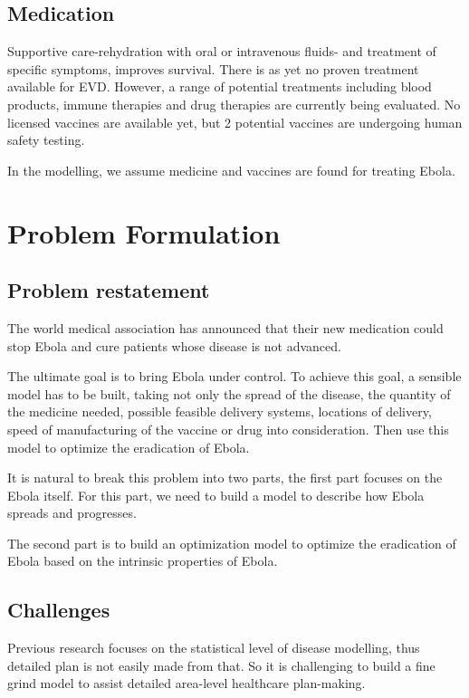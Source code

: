 \documentclass[12pt]{article}
\begin{document}
\subsection{Medication}

Supportive care-rehydration with oral or intravenous fluids- and treatment of specific symptoms, improves survival. There is as yet no proven treatment available for EVD. However, a range of potential treatments including blood products, immune therapies and drug therapies are currently being evaluated. No licensed vaccines are available yet, but 2 potential vaccines are undergoing human safety testing.

In the modelling, we assume medicine and vaccines are found for treating Ebola.


\section{Problem Formulation}

\subsection{Problem restatement}

The world medical association has announced that their new medication could stop Ebola and cure patients whose disease is not advanced. 

The ultimate goal is to bring Ebola under control. To achieve this goal, a sensible model has to be built, taking not only the spread of the disease, the quantity of the medicine needed, possible feasible delivery systems, locations of delivery, speed of manufacturing of the vaccine or drug into consideration. Then use this model to optimize the eradication of Ebola.

It is natural to break this problem into two parts, the first part focuses on the Ebola itself. For this part, we need to build a model to describe how Ebola spreads and progresses. 

The second part is to build an optimization model to optimize the eradication of Ebola based on the intrinsic properties of Ebola. 
\subsection{Challenges}

Previous research focuses on the statistical level of disease modelling, thus detailed plan is not easily made from that. So it is challenging to build a fine grind model to assist detailed area-level healthcare plan-making.
\end{document}
